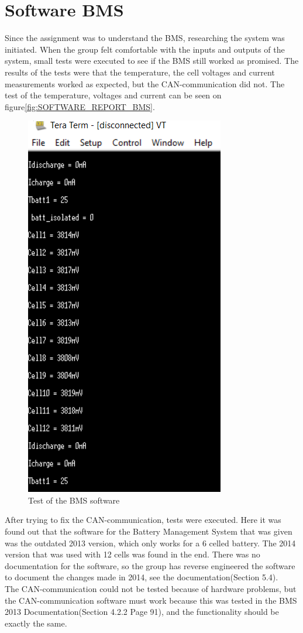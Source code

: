 \section{Software BMS}
Since the assignment was to understand the BMS, researching the system was initiated. When the group felt comfortable with the inputs and outputs of the system, small tests were executed to see if the BMS still worked as promised. The results of the tests were that the temperature, the cell voltages and current measurements worked as expected, but the CAN-communication did not. The test of the temperature, voltages and current can be seen on figure\vref{fig:SOFTWARE_REPORT_BMS}.\\

\begin{figure}[H]
	\centering
	\includegraphics[width=0.4\linewidth]{SubPages/Images/BMS_teraterm_test.PNG}
	\caption{Test of the BMS software}
	\label{fig:SOFTWARE_REPORT_BMS}
\end{figure}

After trying to fix the CAN-communication, tests were executed. Here it was found out that the software for the Battery Management System that was given was the outdated 2013 version, which only works for a 6 celled battery. The 2014 version that was used with 12 cells was found in the end. There was no documentation for the software, so the group has reverse engineered the software to document the changes made in 2014, see the documentation\cite{AU2}(Section 5.4).\\
The CAN-communication could not be tested because of hardware problems, but the CAN-communication software must work because this was tested in the BMS 2013 Documentation\cite{BMSDocumentation}(Section 4.2.2 Page 91), and the functionality should be exactly the same.

